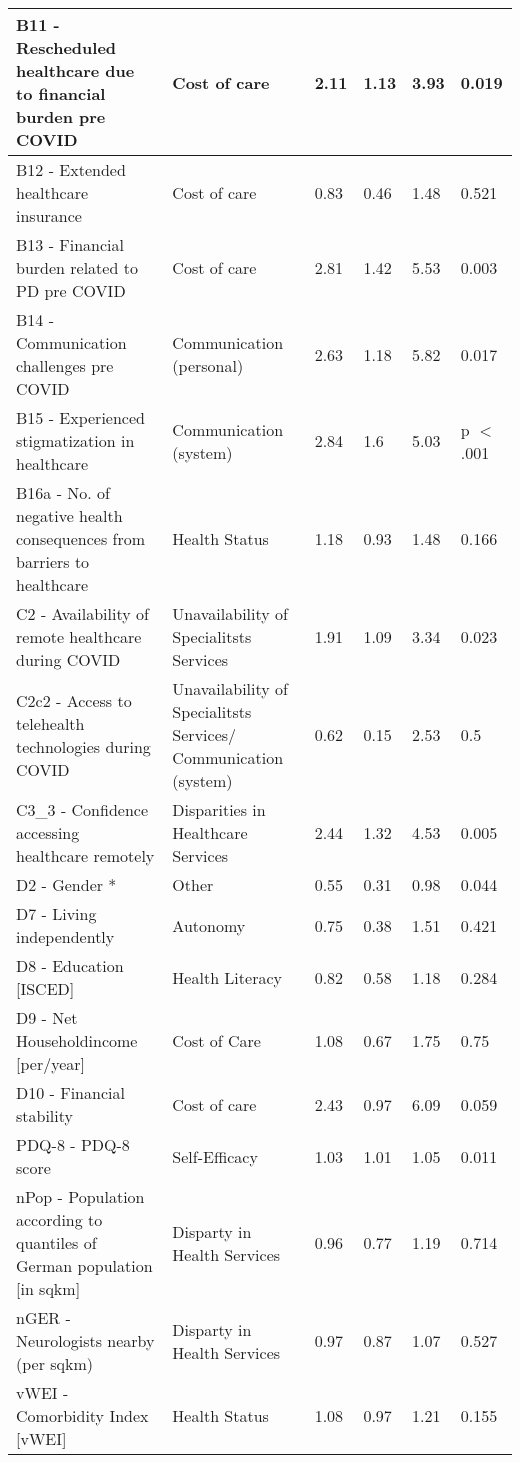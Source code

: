 \documentclass{bmcart}
\begin{document}
\begin{backmatter}
\begin{table}[!ht]
\begin{tabular}{|p{5cm} | p{2cm} |l|l|l|l|}
B11 - Rescheduled healthcare due to financial burden pre COVID & Cost of care & 2.11 & 1.13 & 3.93 & 0.019 \\ \hline
B12 - Extended healthcare insurance & Cost of care & 0.83 & 0.46 & 1.48 & 0.521 \\ \hline
B13 - Financial burden related to PD pre COVID & Cost of care & 2.81 & 1.42 & 5.53 & 0.003 \\ \hline
B14 - Communication challenges pre COVID & Communication (personal) & 2.63 & 1.18 & 5.82 & 0.017 \\ \hline
B15 - Experienced stigmatization in healthcare & Communication (system) & 2.84 & 1.6 & 5.03 & p $<$ .001 \\ \hline
B16a - No. of negative health consequences from barriers to healthcare & Health Status & 1.18 & 0.93 & 1.48 & 0.166 \\ \hline
C2 - Availability of remote healthcare during COVID & Unavailability of Specialitsts Services & 1.91 & 1.09 & 3.34 & 0.023 \\ \hline
C2c2 - Access to telehealth technologies during COVID & Unavailability of Specialitsts Services/ Communication (system) & 0.62 & 0.15 & 2.53 & 0.5 \\ \hline
C3\_3 - Confidence accessing healthcare remotely & Disparities in Healthcare Services & 2.44 & 1.32 & 4.53 & 0.005 \\ \hline
D2 - Gender * & Other & 0.55 & 0.31 & 0.98 & 0.044 \\ \hline
D7 - Living independently & Autonomy & 0.75 & 0.38 & 1.51 & 0.421 \\ \hline
D8 - Education [ISCED] & Health Literacy & 0.82 & 0.58 & 1.18 & 0.284 \\ \hline
D9 - Net Householdincome [per/year] & Cost of Care & 1.08 & 0.67 & 1.75 & 0.75 \\ \hline
D10 - Financial stability & Cost of care & 2.43 & 0.97 & 6.09 & 0.059 \\ \hline
PDQ-8 - PDQ-8 score & Self-Efficacy & 1.03 & 1.01 & 1.05 & 0.011 \\ \hline
nPop - Population according to quantiles of German population [in sqkm] & Disparty in Health Services & 0.96 & 0.77 & 1.19 & 0.714 \\ \hline
nGER - Neurologists nearby (per sqkm) & Disparty in Health Services & 0.97 & 0.87 & 1.07 & 0.527 \\ \hline
vWEI - Comorbidity Index [vWEI] & Health Status & 1.08 & 0.97 & 1.21 & 0.155 \\ \hline
\end{tabular}
\end{table}

\end{backmatter}
\end{document}
